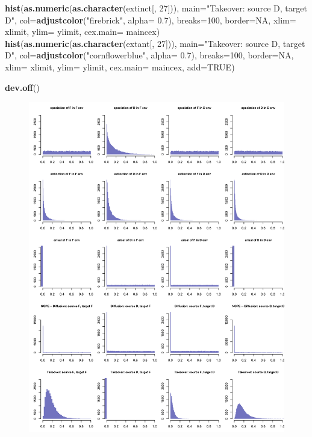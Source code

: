 \documentclass[]{book}
\newenvironment{Shaded}{\begin{snugshade}}{\end{snugshade}}
\newcommand{\KeywordTok}[1]{\textcolor[rgb]{0.13,0.29,0.53}{\textbf{{#1}}}}
\newcommand{\DataTypeTok}[1]{\textcolor[rgb]{0.13,0.29,0.53}{{#1}}}
\newcommand{\DecValTok}[1]{\textcolor[rgb]{0.00,0.00,0.81}{{#1}}}
\newcommand{\FloatTok}[1]{\textcolor[rgb]{0.00,0.00,0.81}{{#1}}}
\newcommand{\StringTok}[1]{\textcolor[rgb]{0.31,0.60,0.02}{{#1}}}
\newcommand{\OtherTok}[1]{\textcolor[rgb]{0.56,0.35,0.01}{{#1}}}
\newcommand{\NormalTok}[1]{{#1}}
\theoremstyle{definition}
\theoremstyle{definition}
\theoremstyle{remark}
\begin{document}
\begin{Shaded}
\begin{Highlighting}[]
\KeywordTok{hist}\NormalTok{(}\KeywordTok{as.numeric}\NormalTok{(}\KeywordTok{as.character}\NormalTok{(extinct[, }\DecValTok{27}\NormalTok{])), }\DataTypeTok{main=}\StringTok{"Takeover: source D, target D"}\NormalTok{, }\DataTypeTok{col=}\KeywordTok{adjustcolor}\NormalTok{(}\StringTok{"firebrick"}\NormalTok{, }\DataTypeTok{alpha=} \FloatTok{0.7}\NormalTok{), }\DataTypeTok{breaks=}\DecValTok{100}\NormalTok{, }\DataTypeTok{border=}\OtherTok{NA}\NormalTok{, }\DataTypeTok{xlim=}\NormalTok{ xlimit, }\DataTypeTok{ylim=}\NormalTok{ ylimit, }\DataTypeTok{cex.main=}\NormalTok{ maincex)}
\KeywordTok{hist}\NormalTok{(}\KeywordTok{as.numeric}\NormalTok{(}\KeywordTok{as.character}\NormalTok{(extant[, }\DecValTok{27}\NormalTok{])), }\DataTypeTok{main=}\StringTok{"Takeover: source D, target D"}\NormalTok{, }\DataTypeTok{col=}\KeywordTok{adjustcolor}\NormalTok{(}\StringTok{"cornflowerblue"}\NormalTok{, }\DataTypeTok{alpha=} \FloatTok{0.7}\NormalTok{), }\DataTypeTok{breaks=}\DecValTok{100}\NormalTok{, }\DataTypeTok{border=}\OtherTok{NA}\NormalTok{, }\DataTypeTok{xlim=}\NormalTok{ xlimit, }\DataTypeTok{ylim=}\NormalTok{ ylimit, }\DataTypeTok{cex.main=}\NormalTok{ maincex, }\DataTypeTok{add=}\OtherTok{TRUE}\NormalTok{)}


\KeywordTok{dev.off}\NormalTok{()}
\end{Highlighting}
\end{Shaded}

\begin{figure}
\centering
\includegraphics{Global_success_rate_per_parameter.png}
\caption{}
\end{figure}
\end{document}
